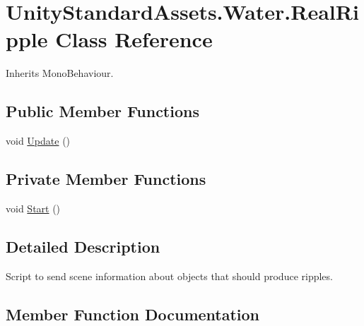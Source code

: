 \hypertarget{class_unity_standard_assets_1_1_water_1_1_real_ripple}{}\section{Unity\+Standard\+Assets.\+Water.\+Real\+Ripple Class Reference}
\label{class_unity_standard_assets_1_1_water_1_1_real_ripple}


Inherits Mono\+Behaviour.

\subsection*{Public Member Functions}
\begin{DoxyCompactItemize}
\item 
void \hyperlink{class_unity_standard_assets_1_1_water_1_1_real_ripple_ae2a081e856692d87b0f4e8e0f8f2861e}{Update} ()
\end{DoxyCompactItemize}
\subsection*{Private Member Functions}
\begin{DoxyCompactItemize}
\item 
void \hyperlink{class_unity_standard_assets_1_1_water_1_1_real_ripple_a0f272f7fc03af9a365c4c2f60aefa616}{Start} ()
\end{DoxyCompactItemize}


\subsection{Detailed Description}
Script to send scene information about objects that should produce ripples. 



\subsection{Member Function Documentation}
\mbox{\label{class_unity_standard_assets_1_1_water_1_1_real_ripple_a0f272f7fc03af9a365c4c2f60aefa616}} 
